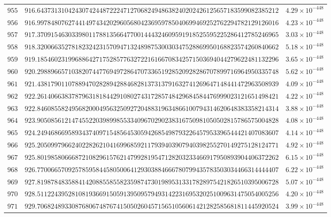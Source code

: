\documentclass[12pt,reqno]{amsart}
\theoremstyle{remark}
\begin{document}
\begin{longtable}{clc}
$955$ & $916.6437313104243074244872224712706824948638240202426125657183599082385212$ & $4.29\times 10^{-448}$ \\
$956$ & $916.9978480762744149743420296056804236959785040699469252762294782129126016$ & $4.23\times 10^{-448}$ \\
$957$ & $917.3709154630339801178813566477001444324609591918525595225286412785246965$ & $3.03\times 10^{-448}$ \\
$958$ & $918.3200663527818232423157094713248987530030347528869950168823574260840662$ & $5.18\times 10^{-448}$ \\
$959$ & $919.1854602319968864271752857763272216166708342571503694044279622481132296$ & $3.65\times 10^{-448}$ \\
$960$ & $920.2988966571038207447769497286470733651928520928286707899716964950335748$ & $5.62\times 10^{-448}$ \\
$961$ & $921.4381790110788947028289428846828137313791632741269647148441472963508939$ & $4.09\times 10^{-448}$ \\
$962$ & $922.2614066383787963181844291080274317285748429684584476999023121651498421$ & $4.22\times 10^{-448}$ \\
$963$ & $922.8460855824956820004956325092720488319634866100794314620648383358214314$ & $3.88\times 10^{-448}$ \\
$964$ & $923.9050856121474552203989985533409670290238316750981050502815786575004828$ & $4.08\times 10^{-448}$ \\
$965$ & $924.2494686695893437409715485645305942685498793226457953396544421407083607$ & $4.14\times 10^{-448}$ \\
$966$ & $925.2050997966240228262104169968592117939403907940398255270149275128124771$ & $4.92\times 10^{-448}$ \\
$967$ & $925.8019858066687210829615762147992819547128203233466917950893904406372262$ & $6.15\times 10^{-448}$ \\
$968$ & $926.7700665709257859584458050064129303884666780799435783503034466314444407$ & $6.22\times 10^{-448}$ \\
$969$ & $927.8198784835884142088558558235987473019895313317828975421826510395006728$ & $5.07\times 10^{-448}$ \\
$970$ & $928.5112243952810819366915059139509579493142231695320251009631475054005256$ & $4.20\times 10^{-448}$ \\
$971$ & $929.7068248933087680674876741505026045715651056061421282585681811445920524$ & $3.99\times 10^{-448}$ \\

\end{longtable}
\end{document}
